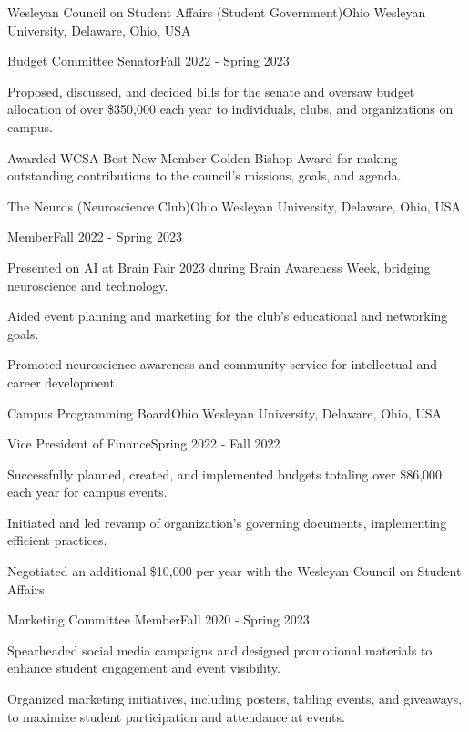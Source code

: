 \begin{leadershipentry}{Wesleyan Council on Student Affairs (Student Government)}{Ohio Wesleyan University, Delaware, Ohio, USA}
    \begin{positionentry}{Budget Committee Senator}{Fall 2022 - Spring 2023}
        \item Proposed, discussed, and decided bills for the senate and oversaw budget allocation of over \$350,000 each year to individuals, clubs, and organizations on campus.
        \item Awarded WCSA Best New Member Golden Bishop Award for making outstanding contributions to the council's missions, goals, and agenda.
    \end{positionentry}
\end{leadershipentry}

\begin{leadershipentry}{The Neurds (Neuroscience Club)}{Ohio Wesleyan University, Delaware, Ohio, USA}
    \begin{positionentry}{Member}{Fall 2022 - Spring 2023}
        \item Presented on AI at Brain Fair 2023 during Brain Awareness Week, bridging neuroscience and technology.
        \item Aided event planning and marketing for the club's educational and networking goals.
        \item Promoted neuroscience awareness and community service for intellectual and career development.
    \end{positionentry}
\end{leadershipentry}

\begin{leadershipentry}{Campus Programming Board}{Ohio Wesleyan University, Delaware, Ohio, USA}
    \begin{positionentry}{Vice President of Finance}{Spring 2022 - Fall 2022}
        \item Successfully planned, created, and implemented budgets totaling over \$86,000 each year for campus events.
        \item Initiated and led revamp of organization's governing documents, implementing efficient practices.
        \item Negotiated an additional \$10,000 per year with the Wesleyan Council on Student Affairs.
    \end{positionentry}

    \begin{positionentry}{Marketing Committee Member}{Fall 2020 - Spring 2023}
        \item Spearheaded social media campaigns and designed promotional materials to enhance student engagement and event visibility.
        \item Organized marketing initiatives, including posters, tabling events, and giveaways, to maximize student participation and attendance at events.
    \end{positionentry}
\end{leadershipentry}

